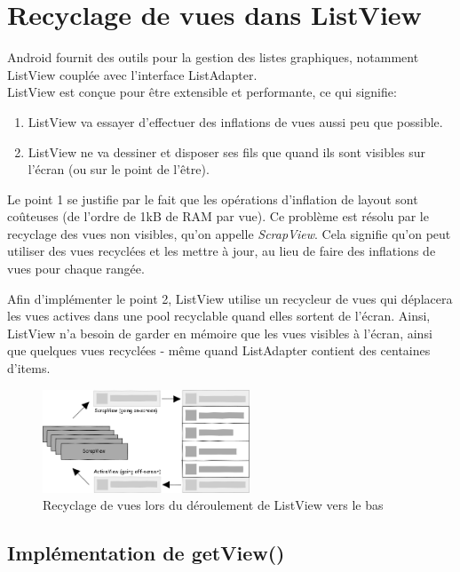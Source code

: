 \section{Recyclage de vues dans ListView}
Android fournit des outils pour la gestion des listes graphiques, notamment ListView couplée avec l’interface ListAdapter.\\
ListView est conçue pour être extensible et performante, ce qui signifie:

\begin{enumerate}
\item ListView va essayer d’effectuer des inflations de vues aussi peu que possible.
\item ListView ne va dessiner et disposer ses fils que quand ils sont visibles sur l’écran (ou sur le point de l'être).
\end{enumerate}

\wl Le point 1 se justifie par le fait que les opérations d’inflation de layout sont coûteuses (de l’ordre de 1kB de RAM par vue). Ce problème est résolu par le recyclage des vues non visibles, qu’on appelle \emph{ScrapView}. Cela signifie qu’on peut utiliser des vues recyclées et les mettre à jour, au lieu de faire des inflations de vues pour chaque rangée.

Afin d’implémenter le point 2, ListView utilise un recycleur de vues qui déplacera les vues actives dans une pool recyclable quand elles sortent de l’écran. 
Ainsi, ListView n'a besoin de garder en mémoire que les vues visibles à l'écran, ainsi que quelques vues recyclées - même quand ListAdapter contient des centaines d'items. \\

\begin{figure}[h!]
  \center
  \includegraphics[width=0.55\textwidth]{resources/listview_recycling.png}
  \caption{Recyclage de vues lors du déroulement de ListView vers le bas}
  \label{fig:listview_recycling}
\end{figure}

\newpage
\subsection*{Implémentation de getView()}

